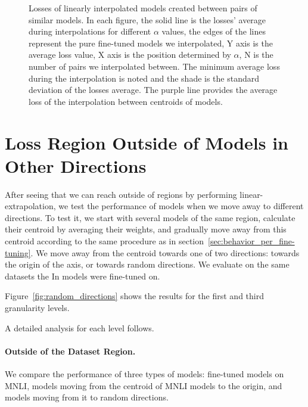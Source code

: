 \documentclass[nohyperref]{article}
\theoremstyle{plain}
\theoremstyle{definition}
\theoremstyle{remark}
\begin{document}
\begin{figure*}[t]
\caption{Losses of linearly interpolated models created between pairs of similar models. In each figure, the solid line is the losses' average during interpolations for different $ \alpha $ values, the edges of the lines represent the pure fine-tuned models we interpolated, Y axis is the average loss value, X axis is the position determined by $\alpha$, N is the number of pairs we interpolated between. The minimum average loss during the interpolation is noted and the shade is the standard deviation of the losses average. The purple line provides the average loss of the interpolation between centroids of models.
\label{fig:interpolation_all}}
\end{figure*}


\section{Loss Region Outside of Models in Other Directions}\label{ap:sec:not_inter_edge}
After seeing that we can reach outside of regions by performing linear-extrapolation, we test the performance of models when we move away to different directions. 
To test it, we start with several models of the same region, calculate their centroid by averaging their weights, and gradually move away from this centroid according to the same procedure as in section~\ref{sec:behavior_per_fine-tuning}. We move away from the centroid towards one of two directions: towards the origin of the axis, or towards random directions.  
We evaluate on the same datasets the In models were fine-tuned on. 

Figure~\ref{fig:random_directions} shows the results for the first and third granularity levels. 

A detailed analysis for each level follows. 


\paragraph{Outside of the Dataset Region.}
We compare the performance of three types of models: fine-tuned models on MNLI, models moving from the centroid of MNLI models to the origin, and models moving from it to random directions. 
\end{document}
